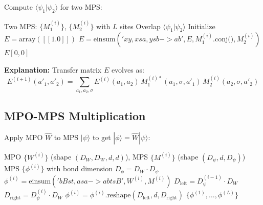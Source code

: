 \documentclass[aps,prb,onecolumn,scriptaddress]{revtex4-2}
\newcommand{\braket}[2]{\langle#1|#2\rangle}
\begin{document}
	Compute $\braket{\psi_1}{\psi_2}$ for two MPS:
	
	\begin{algorithm}[H]
		\caption{ComputeOverlap}
		\begin{algorithmic}[1]
			\Require Two MPS: $\{M_1^{(i)}\}$, $\{M_2^{(i)}\}$ with $L$ sites
			\Ensure Overlap $\braket{\psi_1}{\psi_2}$
			\State Initialize $E = \text{array}([[1.0]])$ 
			\State {}
			\State $E = \text{einsum}('xy,xsa,ysb->ab', E, M_1^{(i)}\text{.conj()}, M_2^{(i)})$
			\EndFor
			\State \Return $E[0, 0]$ 
		\end{algorithmic}
	\end{algorithm}
	
	\textbf{Explanation:} Transfer matrix $E$ evolves as:
	\begin{equation}
		E^{(i+1)}(a'_1, a'_2) = \sum_{a_1, a_2, \sigma} E^{(i)}(a_1, a_2) \, M_1^{(i)*}(a_1, \sigma, a'_1) \, M_2^{(i)}(a_2, \sigma, a'_2)
	\end{equation}
	
	\subsection{MPO-MPS Multiplication}
	
	Apply MPO $\hat{W}$ to MPS $|\psi\rangle$ to get $|\phi\rangle = \hat{W}|\psi\rangle$:
	
	\begin{algorithm}[H]
		\caption{ApplyMPOtoMPS}
		\begin{algorithmic}[1]
			\Require MPO $\{W^{(i)}\}$ (shape $(D_W, D_W, d, d)$), MPS $\{M^{(i)}\}$ (shape $(D_\psi, d, D_\psi)$)
			\Ensure MPS $\{\phi^{(i)}\}$ with bond dimension $D_\phi = D_W \cdot D_\psi$
			\State {}
			\State $\phi^{(i)} = \text{einsum}('bBst,asa->abtsB', W^{(i)}, M^{(i)})$
			\State {}
			\State {}
			\State {}
			\State $D_{\text{left}} = D_\psi^{(i-1)} \cdot D_W$
			\State $D_{\text{right}} = D_\psi^{(i)} \cdot D_W$
			\State $\phi^{(i)} = \phi^{(i)}\text{.reshape}(D_{\text{left}}, d, D_{\text{right}})$
			\EndFor
			\State \Return $\{\phi^{(1)}, \ldots, \phi^{(L)}\}$
		\end{algorithmic}
	\end{algorithm}
	
\end{document}
